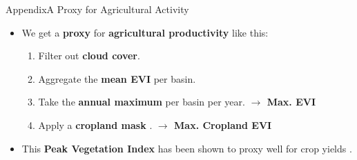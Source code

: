 \documentclass[aspectratio=169,11pt,dvipsnames, handout]{beamer}
\begin{document}
\begin{frame}{\textcolor{defaultclr!30}{Appendix}\hspace{0.75em}A Proxy for Agricultural Activity}

\begin{itemize}
    \item We get a \textbf{proxy} for \textbf{agricultural productivity} like this:

\begin{tcolorbox}[colback=ForestGreen!20, colframe=ForestGreen!20, fontupper=\color{ForestGreen!40!black}, width=\linewidth, sharp corners, boxrule=0pt]
\begin{enumerate}[(1)]
    \item Filter out \textbf{cloud cover}.
    \item Aggregate the \textbf{mean EVI} per basin.
    \item Take the \textbf{annual maximum} per basin per year. \colorbox{ForestGreen!80}{\bfseries\color{white} $\rightarrow$ Max. EVI}
    \item Apply a \textbf{cropland mask} \parencite{DigitalEarthAfrica2022}. \colorbox{ForestGreen!80}{\bfseries\color{white} $\rightarrow$ Max. Cropland EVI}
\end{enumerate}
\end{tcolorbox}

\vspace{0.5em}

\item This \textbf{Peak Vegetation Index} has been shown to proxy well for crop yields \parencite{azzari2017, beckerreshef2010, bolton2013, johnson2016}.
\end{itemize}
\end{frame}

\end{document}

